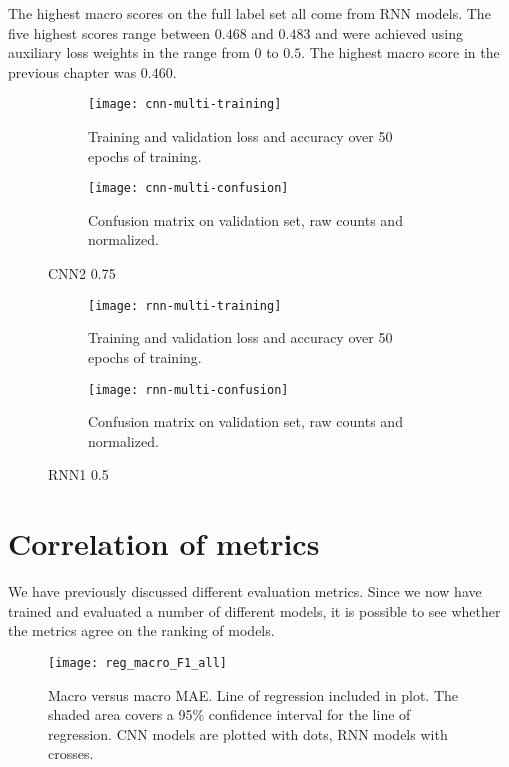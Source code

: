 The highest macro \FI scores on the full label set all come from RNN models.
The five highest scores range between $0.468$ and $0.483$ and were achieved
using auxiliary loss weights in the range from $0$ to $0.5$.
The highest macro \FI score in the previous chapter was $0.460$.


\begin{figure}
  \begin{subfigure}{\linewidth}
    \centering
    \texttt{[image: cnn-multi-training]}
    \caption{Training and validation loss and accuracy over 50 epochs of training.}
  \end{subfigure}
  \begin{subfigure}{\linewidth}
    \centering
    \texttt{[image: cnn-multi-confusion]}
    \caption{Confusion matrix on validation set, raw counts and normalized.}
  \end{subfigure}
  \caption{CNN2 0.75}
  \label{fig:cnn-multi-training}
\end{figure}

\begin{figure}
  \begin{subfigure}{\linewidth}
    \centering
    \texttt{[image: rnn-multi-training]}
    \caption{Training and validation loss and accuracy over 50 epochs of training.}
  \end{subfigure}
  \begin{subfigure}{\linewidth}
    \centering
    \texttt{[image: rnn-multi-confusion]}
    \caption{Confusion matrix on validation set, raw counts and normalized.}
  \end{subfigure}
  \caption{RNN1 0.5}
  \label{fig:rnn-multi-training}
\end{figure}


\section{Correlation of metrics}


We have previously discussed different evaluation metrics. Since we now have
trained and evaluated a number of different models, it is possible to see
whether the metrics agree on the ranking of models.

\begin{figure}
  \centering
  \texttt{[image: reg\_macro\_F1\_all]}
  \caption[Macro \FI versus macro MAE]{
    Macro \FI versus macro MAE. Line of regression included in plot. The shaded
    area covers a 95\% confidence interval for the line of regression. CNN
    models are plotted with dots, RNN models with crosses.
  }
  \label{fig:reg_macro_F1_all}
\end{figure}

